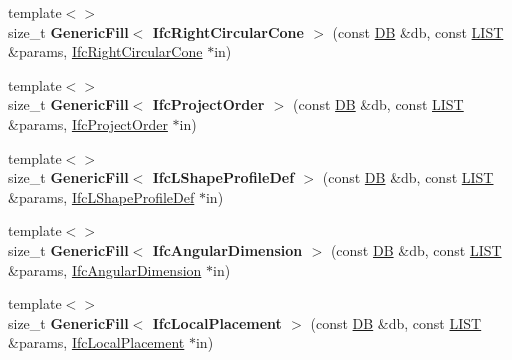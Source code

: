 \begin{DoxyCompactItemize}
\item 
\hypertarget{namespace_assimp_1_1_s_t_e_p_ac9db339e149ee5f3892cec9a34a9b4a0}{{\footnotesize template$<$$>$ }\\size\+\_\+t {\bfseries Generic\+Fill$<$ Ifc\+Right\+Circular\+Cone $>$} (const \hyperlink{class_assimp_1_1_s_t_e_p_1_1_d_b}{D\+B} \&db, const \hyperlink{class_assimp_1_1_s_t_e_p_1_1_e_x_p_r_e_s_s_1_1_l_i_s_t}{L\+I\+S\+T} \&params, \hyperlink{struct_assimp_1_1_i_f_c_1_1_ifc_right_circular_cone}{Ifc\+Right\+Circular\+Cone} $\ast$in)}\label{namespace_assimp_1_1_s_t_e_p_ac9db339e149ee5f3892cec9a34a9b4a0}

\item 
\hypertarget{namespace_assimp_1_1_s_t_e_p_ab597cc0f4dfa0b8948e8a29bf608a0d0}{{\footnotesize template$<$$>$ }\\size\+\_\+t {\bfseries Generic\+Fill$<$ Ifc\+Project\+Order $>$} (const \hyperlink{class_assimp_1_1_s_t_e_p_1_1_d_b}{D\+B} \&db, const \hyperlink{class_assimp_1_1_s_t_e_p_1_1_e_x_p_r_e_s_s_1_1_l_i_s_t}{L\+I\+S\+T} \&params, \hyperlink{struct_assimp_1_1_i_f_c_1_1_ifc_project_order}{Ifc\+Project\+Order} $\ast$in)}\label{namespace_assimp_1_1_s_t_e_p_ab597cc0f4dfa0b8948e8a29bf608a0d0}

\item 
\hypertarget{namespace_assimp_1_1_s_t_e_p_aae93516b3ca14e482391f8ae63352cec}{{\footnotesize template$<$$>$ }\\size\+\_\+t {\bfseries Generic\+Fill$<$ Ifc\+L\+Shape\+Profile\+Def $>$} (const \hyperlink{class_assimp_1_1_s_t_e_p_1_1_d_b}{D\+B} \&db, const \hyperlink{class_assimp_1_1_s_t_e_p_1_1_e_x_p_r_e_s_s_1_1_l_i_s_t}{L\+I\+S\+T} \&params, \hyperlink{struct_assimp_1_1_i_f_c_1_1_ifc_l_shape_profile_def}{Ifc\+L\+Shape\+Profile\+Def} $\ast$in)}\label{namespace_assimp_1_1_s_t_e_p_aae93516b3ca14e482391f8ae63352cec}

\item 
\hypertarget{namespace_assimp_1_1_s_t_e_p_a675475a19f717ec9222735352c65a334}{{\footnotesize template$<$$>$ }\\size\+\_\+t {\bfseries Generic\+Fill$<$ Ifc\+Angular\+Dimension $>$} (const \hyperlink{class_assimp_1_1_s_t_e_p_1_1_d_b}{D\+B} \&db, const \hyperlink{class_assimp_1_1_s_t_e_p_1_1_e_x_p_r_e_s_s_1_1_l_i_s_t}{L\+I\+S\+T} \&params, \hyperlink{struct_assimp_1_1_i_f_c_1_1_ifc_angular_dimension}{Ifc\+Angular\+Dimension} $\ast$in)}\label{namespace_assimp_1_1_s_t_e_p_a675475a19f717ec9222735352c65a334}

\item 
\hypertarget{namespace_assimp_1_1_s_t_e_p_a1b4c75513d9b64f1f289294306067f91}{{\footnotesize template$<$$>$ }\\size\+\_\+t {\bfseries Generic\+Fill$<$ Ifc\+Local\+Placement $>$} (const \hyperlink{class_assimp_1_1_s_t_e_p_1_1_d_b}{D\+B} \&db, const \hyperlink{class_assimp_1_1_s_t_e_p_1_1_e_x_p_r_e_s_s_1_1_l_i_s_t}{L\+I\+S\+T} \&params, \hyperlink{struct_assimp_1_1_i_f_c_1_1_ifc_local_placement}{Ifc\+Local\+Placement} $\ast$in)}\label{namespace_assimp_1_1_s_t_e_p_a1b4c75513d9b64f1f289294306067f91}


\end{DoxyCompactItemize}
